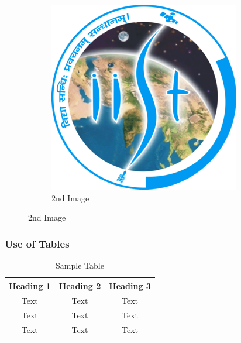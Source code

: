 \documentclass[aspectratio=169]{beamer}
\begin{document}
\begin{frame}
\begin{figure}
\begin{subfigure}[b]{0.35\textwidth}
      \includegraphics[width=\textwidth]{figures/Indian_Institute_of_Space_Science_and_Technology_Logo.png}
      \caption{2nd Image}
      \label{fig:img2}
    \end{subfigure}
  \end{figure}
\end{frame}

\begin{frame}
  \frametitle{Use of Tables}
  \begin{table}
    \centering
    \begin{tabular}{||c|c|c||}
      \hline
      \textbf{Heading 1} & \textbf{Heading 2} & \textbf{Heading 3}\\
      \hline
      Text & Text & Text \\
      \hline
      Text & Text & Text \\
      \hline
      Text & Text & Text \\
      \hline
    \end{tabular}
    \caption{Sample Table}

  \end{table}
\end{frame}
\end{document}
